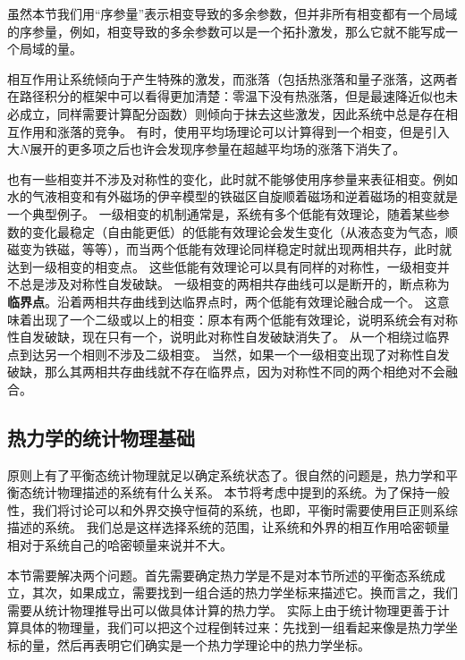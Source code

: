 \documentclass[hyperref, UTF8, a4paper]{ctexart}
\renewcommand{\autoref}{\prettyref}
\begin{document}
虽然本节我们用“序参量”表示相变导致的多余参数，但并非所有相变都有一个局域的序参量，例如，相变导致的多余参数可以是一个拓扑激发，那么它就不能写成一个局域的量。

相互作用让系统倾向于产生特殊的激发，而涨落（包括热涨落和量子涨落，这两者在路径积分的框架中可以看得更加清楚：零温下没有热涨落，但是最速降近似也未必成立，同样需要计算配分函数）则倾向于抹去这些激发，因此系统中总是存在相互作用和涨落的竞争。
有时，使用平均场理论可以计算得到一个相变，但是引入大$N$展开的更多项之后也许会发现序参量在超越平均场的涨落下消失了。


也有一些相变并不涉及对称性的变化，此时就不能够使用序参量来表征相变。例如水的气液相变和有外磁场的伊辛模型的铁磁区自旋顺着磁场和逆着磁场的相变就是一个典型例子。
一级相变的机制通常是，系统有多个低能有效理论，随着某些参数的变化最稳定（自由能更低）的低能有效理论会发生变化（从液态变为气态，顺磁变为铁磁，等等），而当两个低能有效理论同样稳定时就出现两相共存，此时就达到一级相变的相变点。
这些低能有效理论可以具有同样的对称性，一级相变并不总是涉及对称性自发破缺。
一级相变的两相共存曲线可以是断开的，断点称为\textbf{临界点}。沿着两相共存曲线到达临界点时，两个低能有效理论融合成一个。
这意味着出现了一个二级或以上的相变：原本有两个低能有效理论，说明系统会有对称性自发破缺，现在只有一个，说明此对称性自发破缺消失了。
从一个相绕过临界点到达另一个相则不涉及二级相变。
当然，如果一个一级相变出现了对称性自发破缺，那么其两相共存曲线就不存在临界点，因为对称性不同的两个相绝对不会融合。

\subsection{热力学的统计物理基础}\label{sec:from-statistical-to-thermo}

原则上有了平衡态统计物理就足以确定系统状态了。很自然的问题是，热力学和平衡态统计物理描述的系统有什么关系。
本节将考虑\autoref{sec:equilibrium-system}中提到的系统。为了保持一般性，我们将讨论可以和外界交换守恒荷的系统，也即，平衡时需要使用巨正则系综描述的系统。
我们总是这样选择系统的范围，让系统和外界的相互作用哈密顿量相对于系统自己的哈密顿量来说并不大。

本节需要解决两个问题。首先需要确定热力学是不是对本节所述的平衡态系统成立，其次，如果成立，需要找到一组合适的热力学坐标来描述它。换而言之，我们需要从统计物理推导出可以做具体计算的热力学。
实际上由于统计物理更善于计算具体的物理量，我们可以把这个过程倒转过来：先找到一组看起来像是热力学坐标的量，然后再表明它们确实是一个热力学理论中的热力学坐标。
\end{document}
